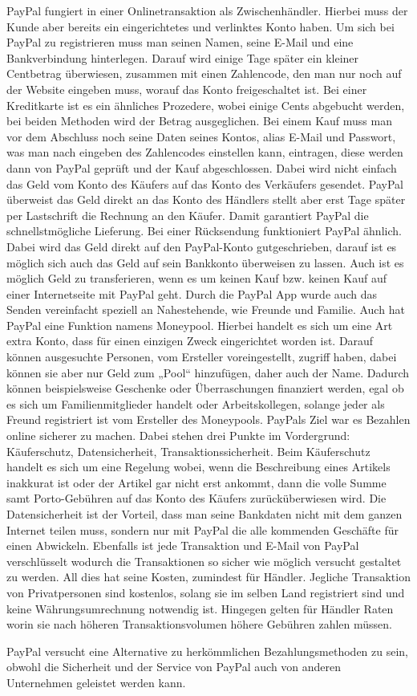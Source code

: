 
PayPal fungiert in einer Onlinetransaktion als Zwischenhändler. Hierbei muss der Kunde aber bereits ein eingerichtetes und verlinktes Konto haben. Um sich bei PayPal zu registrieren muss man seinen Namen, seine E-Mail und eine Bankverbindung hinterlegen. Darauf wird einige Tage später ein kleiner Centbetrag überwiesen, zusammen mit einen Zahlencode, den man nur noch auf der Website eingeben muss, worauf das Konto freigeschaltet ist. Bei einer Kreditkarte ist es ein ähnliches Prozedere, wobei einige Cents abgebucht werden, bei beiden Methoden wird der Betrag ausgeglichen. Bei einem Kauf muss man vor dem Abschluss noch seine Daten seines Kontos, alias E-Mail und Passwort, was man nach eingeben des Zahlencodes einstellen kann, eintragen, diese werden dann von PayPal geprüft und der Kauf abgeschlossen. Dabei wird nicht einfach das Geld vom Konto des Käufers auf das Konto des Verkäufers gesendet. PayPal überweist das Geld direkt an das Konto des Händlers stellt aber erst Tage später per Lastschrift die Rechnung an den Käufer. Damit garantiert PayPal die schnellstmögliche Lieferung. Bei einer Rücksendung funktioniert PayPal ähnlich. Dabei wird das Geld direkt auf den PayPal-Konto gutgeschrieben, darauf ist es möglich sich auch das Geld auf sein Bankkonto überweisen zu lassen. Auch ist es möglich Geld zu transferieren, wenn es um keinen Kauf bzw. keinen Kauf auf einer Internetseite mit PayPal geht. Durch die PayPal App wurde auch das Senden vereinfacht speziell an Nahestehende, wie Freunde und Familie. Auch hat PayPal eine Funktion namens Moneypool. Hierbei handelt es sich um eine Art extra Konto, dass für einen einzigen Zweck eingerichtet worden ist. Darauf können ausgesuchte Personen, vom Ersteller voreingestellt, zugriff haben, dabei können sie aber nur Geld zum „Pool“ hinzufügen, daher auch der Name. Dadurch können beispielsweise Geschenke oder Überraschungen finanziert werden, egal ob es sich um Familienmitglieder handelt oder Arbeitskollegen, solange jeder als Freund registriert ist vom Ersteller des Moneypools. PayPals Ziel war es Bezahlen online sicherer zu machen. Dabei stehen drei Punkte im Vordergrund: Käuferschutz, Datensicherheit, Transaktionssicherheit. Beim Käuferschutz handelt es sich um eine Regelung wobei, wenn die Beschreibung eines Artikels inakkurat ist oder der Artikel gar nicht erst ankommt, dann die volle Summe samt Porto-Gebühren auf das Konto des Käufers zurücküberwiesen wird. Die Datensicherheit ist der Vorteil, dass man seine Bankdaten nicht mit dem ganzen Internet teilen muss, sondern nur mit PayPal die alle kommenden Geschäfte für einen Abwickeln. Ebenfalls ist jede Transaktion und E-Mail von PayPal verschlüsselt wodurch die Transaktionen so sicher wie möglich versucht gestaltet zu werden. All dies hat seine Kosten, zumindest für Händler. Jegliche Transaktion von Privatpersonen sind kostenlos, solang sie im selben Land registriert sind und keine Währungsumrechnung notwendig ist. Hingegen gelten für Händler Raten worin sie nach höheren Transaktionsvolumen höhere Gebühren zahlen müssen.

PayPal versucht eine Alternative zu herkömmlichen Bezahlungsmethoden zu sein, obwohl die Sicherheit und der Service von PayPal auch von anderen Unternehmen geleistet werden kann.